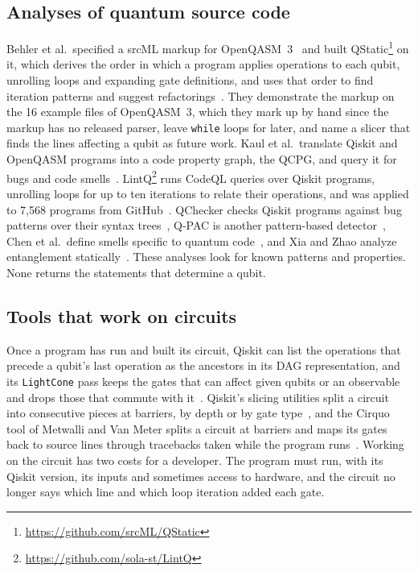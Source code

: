 \subsection{Analyses of quantum source code}
Behler et al.\ specified a srcML markup for OpenQASM~3~\cite{behler2024supporting} and built QStatic\footnote{\url{https://github.com/srcML/QStatic}} on it, which
derives the order in which a program applies operations to each qubit, unrolling loops and expanding gate definitions,
and uses that order to find iteration patterns and suggest refactorings~\cite{behler2025static}. They demonstrate the
markup on the 16 example files of OpenQASM~3, which they mark up by hand since the markup has no released parser, leave \texttt{while} loops for later, and name a slicer that finds the
lines affecting a qubit as future work. Kaul et al.\ translate Qiskit and OpenQASM programs into a code property graph,
the QCPG, and query it for bugs and code smells~\cite{kaul2023uniform}. LintQ\footnote{\url{https://github.com/sola-st/LintQ}} runs CodeQL queries over Qiskit programs,
unrolling loops for up to ten iterations to relate their operations, and was applied to 7,568 programs from
GitHub~\cite{paltenghi2024lintq}. QChecker checks Qiskit programs against bug patterns over their syntax trees~\cite{zhao2023qchecker}, Q-PAC is
another pattern-based detector~\cite{nayak2023qpac}, Chen et al.\ define smells specific to quantum
code~\cite{chen2023smelly},
and Xia and Zhao analyze entanglement statically~\cite{xia2025entanglement}. These analyses look for known patterns and
properties. None returns the statements that determine a qubit.

\subsection{Tools that work on circuits}
Once a program has run and built its circuit, Qiskit can list the operations that precede a qubit's last operation as
the ancestors in its DAG representation, and its \texttt{LightCone} pass keeps the gates that can affect given qubits or
an observable and drops those that commute with it~\cite{qiskit2025}. Qiskit's slicing utilities split a circuit into consecutive pieces at barriers, by depth or by gate
type~\cite{qiskitaddonutils}, and the Cirquo tool of Metwalli and Van Meter splits a
circuit at barriers and maps its gates back to source lines through tracebacks taken while the program
runs~\cite{metwalli2022debugging, metwalli2024testing}. Working on the circuit has two costs for a developer. The
program must run, with its Qiskit version, its inputs and sometimes access to hardware, and the circuit no longer says
which line and which loop iteration added each gate.

